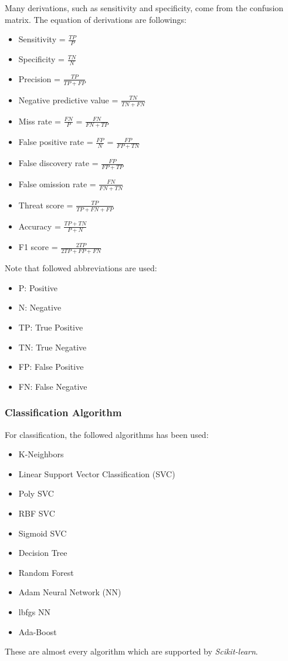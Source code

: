 \documentclass[aps, 11pt, a4paper]{article}
\begin{document}
					Many derivations, such as sensitivity and specificity, come from the confusion matrix. The equation of derivations are followings:
					\begin{itemize}
						\item Sensitivity = $\frac{TP}{P}$
						\item Specificity = $\frac{TN}{N}$
						\item Precision = $\frac{TP}{TP + FP}$
						\item Negative predictive value = $\frac{TN}{TN + FN}$
						\item Miss rate = $\frac{FN}{P}$ = $\frac{FN}{FN + TP}$
						\item False positive rate = $\frac{FP}{N}$ = $\frac{FP}{FP + TN}$
						\item False discovery rate = $\frac{FP}{FP + TP}$
						\item False omission rate = $\frac{FN}{FN + TN}$
						\item Threat score = $\frac{TP}{TP + FN + FP}$
						\item Accuracy = $\frac{TP+TN}{P + N}$
						\item F1 score = $\frac{2TP}{2TP + FP + FN}$
					\end{itemize}
					
					Note that followed abbreviations are used:
					\begin{itemize}
						\item P: Positive
						\item N: Negative
						\item TP: True Positive
						\item TN: True Negative
						\item FP: False Positive
						\item FN: False Negative
					\end{itemize}
				
			\subsubsection{Classification Algorithm}
				For classification, the followed algorithms has been used:
				\begin{itemize}
					\item K-Neighbors
					\item Linear Support Vector Classification (SVC)
					\item Poly SVC
					\item RBF SVC
					\item Sigmoid SVC
					\item Decision Tree
					\item Random Forest
					\item Adam Neural Network (NN)
					\item lbfgs NN
					\item Ada-Boost
				\end{itemize}
				These are almost every algorithm which are supported by \textit{Scikit-learn}.
				
\end{document}
